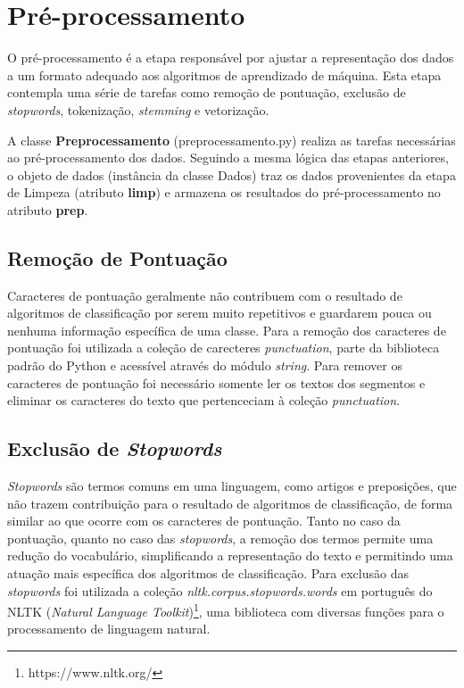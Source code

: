 \section{Pré-processamento}

O pré-processamento é a etapa responsável por ajustar a representação dos dados a um formato adequado aos algoritmos de aprendizado de máquina. Esta etapa contempla uma série de tarefas como remoção de pontuação, exclusão de \textit{stopwords}, tokenização,  \textit{stemming} e vetorização.

A classe \textbf{Preprocessamento} (preprocessamento.py) realiza as tarefas necessárias ao pré-processamento dos dados. Seguindo a mesma lógica das etapas anteriores, o objeto de dados (instância da classe Dados) traz os dados provenientes da etapa de Limpeza (atributo \textbf{limp}) e armazena os resultados do pré-processamento no atributo \textbf{prep}.  

\subsection{Remoção de Pontuação}

Caracteres de pontuação geralmente não contribuem com o resultado de algoritmos de classificação por serem muito repetitivos e guardarem pouca ou nenhuma informação específica de uma classe. Para a remoção dos caracteres de pontuação foi utilizada a coleção de carecteres \textit{punctuation}, parte da biblioteca padrão do Python e acessível através do módulo \textit{string}. Para remover os caracteres de pontuação foi necessário somente ler os textos dos segmentos e eliminar os caracteres do texto que pertenceciam à coleção \textit{punctuation}.

\subsection{Exclusão de \textit{Stopwords}}

\textit{Stopwords} são termos comuns em uma linguagem, como artigos e preposições, que não trazem contribuição para o resultado de algoritmos de classificação, de forma similar ao que ocorre com os caracteres de pontuação. Tanto no caso da pontuação, quanto no caso das \textit{stopwords}, a remoção dos termos permite uma redução do vocabulário, simplificando a representação do texto e permitindo uma atuação mais específica dos algoritmos de classificação. Para exclusão das \textit{stopwords} foi utilizada a coleção \textit{nltk.corpus.stopwords.words} em português do NLTK (\textit{Natural Language Toolkit})\footnote{https://www.nltk.org/}, uma biblioteca com diversas funções para o processamento de linguagem natural.

